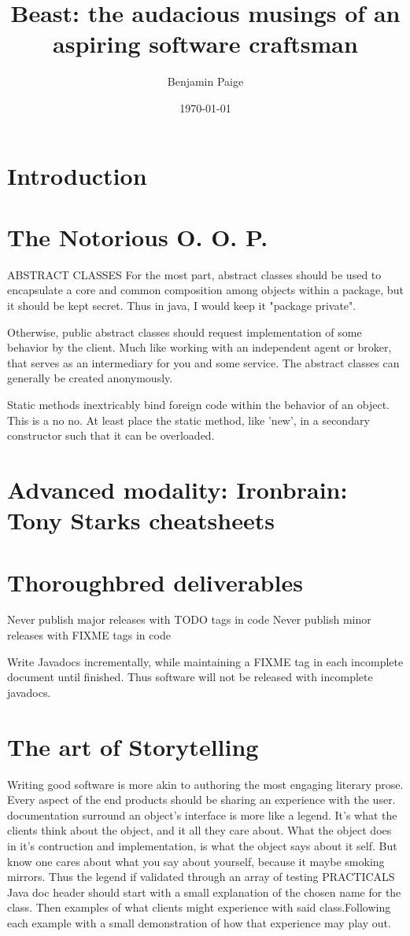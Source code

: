 \documentclass{article}
\title{Beast: the audacious musings of an aspiring software craftsman}
\author{Benjamin Paige}
\date{\today}
\begin{document}
\maketitle

\tableofcontents

\section{Introduction}

\section{The Notorious O. O. P.}
ABSTRACT CLASSES
For the most part, abstract classes should be used to encapsulate a core and common composition among objects within a package, but it should be kept secret.
Thus in java, I would keep it "package private".

Otherwise, public abstract classes should request implementation of some behavior by the client.
Much like working with an independent agent or broker, that serves as an intermediary for you and some service.
The abstract classes can generally be created anonymously. 

Static methods inextricably bind foreign code within the behavior of an object. This is a no no.  At least place the static method, like 'new', in a secondary constructor such that it can be overloaded.

\section{Advanced modality: Ironbrain: Tony Starks cheatsheets}

\section{Thoroughbred deliverables}
Never publish major releases with TODO tags in code
Never publish minor releases with FIXME tags in code

Write Javadocs incrementally, while maintaining a FIXME tag in each incomplete document until finished. 
Thus software will not be released with incomplete javadocs.

\section{The art of Storytelling}
Writing good software is more akin to authoring the most engaging literary prose. Every aspect of the end products should be sharing an experience with the user.
documentation surround an object's interface is more like a legend.  It's what the clients think about the object, and it all they care about.  What the object does in it's contruction and implementation, is what the object says about it self.  But know one cares about what you say about yourself, because it maybe smoking mirrors.  Thus the legend if validated through an array of testing
PRACTICALS
Java doc header should start with a small explanation of the chosen name for the class.  Then examples of what clients might experience with said class.Following each example with a small demonstration of how that experience may play out.
\end{document}
